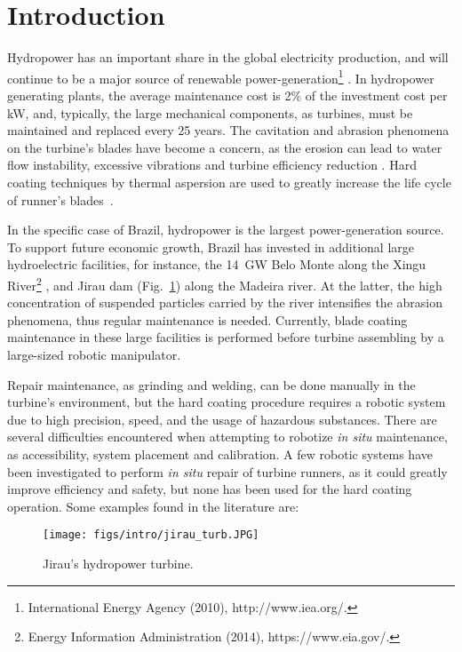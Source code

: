 \section{Introduction}

Hydropower has an important share in the global electricity production, and
will continue to be a major source of renewable
power-generation\footnote{International Energy Agency (2010), http://www.iea.org/.}%
. In hydropower generating plants, the average maintenance cost is 2\% of the
investment cost per kW, and, typically, the large mechanical
components, as turbines, must be maintained and replaced every 25 years.
The cavitation and abrasion phenomena on the turbine's blades have become a
concern, as the erosion can lead to water flow instability, excessive
vibrations and turbine efficiency reduction \cite{goldemberg2007energia}. Hard
coating techniques by thermal aspersion are used to greatly increase the life
cycle of runner's blades~\cite{krella2011new}.

In the specific case of Brazil, hydropower is the largest
power-generation source. To support future economic growth, Brazil has
invested in additional large hydroelectric facilities, for instance, the
14~GW Belo Monte along the Xingu River\footnote{Energy
Information Administration (2014), https://www.eia.gov/.}%
, and Jirau dam (Fig.~\ref{fig::jirau_turb}) along the Madeira river. At the
latter, the high concentration of suspended particles carried by the river intensifies the abrasion phenomena, thus
regular maintenance is needed. Currently, blade coating maintenance in these
large facilities is performed before turbine assembling by a large-sized
robotic manipulator. 

Repair maintenance, as grinding and welding, can be done manually in the
turbine's environment, but the hard coating procedure requires a robotic system
due to high precision, speed, and the usage of hazardous substances.
There are several difficulties encountered when attempting to robotize
\textit{in situ} maintenance, as accessibility, system placement and
calibration. A few robotic systems have been investigated to perform \textit{in
situ} repair of turbine runners, as it could greatly improve efficiency and
safety, but none has been used for the hard coating operation. Some examples found in the literature are:

\begin{figure}[h!]
\centering
	\texttt{[image: figs/intro/jirau\_turb.JPG]} 
	\caption{Jirau's hydropower turbine.}
	\label{fig::jirau_turb}
\end{figure}

